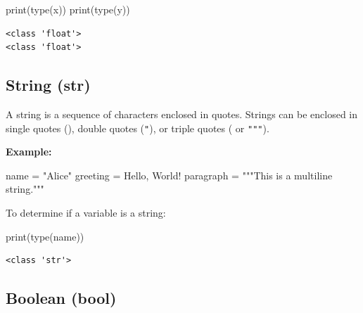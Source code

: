 \documentclass[
  letterpaper,
  DIV=11,
  numbers=noendperiod]{scrreprt}
\newenvironment{Shaded}{\begin{snugshade}}{\end{snugshade}}
\newcommand{\BuiltInTok}[1]{\textcolor[rgb]{0.00,0.23,0.31}{#1}}
\newcommand{\NormalTok}[1]{\textcolor[rgb]{0.00,0.23,0.31}{#1}}
\newcommand{\OperatorTok}[1]{\textcolor[rgb]{0.37,0.37,0.37}{#1}}
\newcommand{\StringTok}[1]{\textcolor[rgb]{0.13,0.47,0.30}{#1}}
\begin{document}
\begin{Shaded}
\begin{Highlighting}[]
\BuiltInTok{print}\NormalTok{(}\BuiltInTok{type}\NormalTok{(x))}
\BuiltInTok{print}\NormalTok{(}\BuiltInTok{type}\NormalTok{(y))}
\end{Highlighting}
\end{Shaded}

\begin{verbatim}
<class 'float'>
<class 'float'>
\end{verbatim}

\hypertarget{string-str}{%
\subsection{String (str)}\label{string-str}}

A string is a sequence of characters enclosed in quotes. Strings can be
enclosed in single quotes (\texttt{\textquotesingle{}}), double quotes
(\texttt{"}), or triple quotes
(\texttt{\textquotesingle{}\textquotesingle{}\textquotesingle{}} or
\texttt{"""}).

\textbf{Example:}

\begin{Shaded}
\begin{Highlighting}[]
\NormalTok{name }\OperatorTok{=} \StringTok{"Alice"}
\NormalTok{greeting }\OperatorTok{=} \StringTok{\textquotesingle{}Hello, World!\textquotesingle{}}
\NormalTok{paragraph }\OperatorTok{=} \StringTok{"""This is a}
\StringTok{multiline string."""}
\end{Highlighting}
\end{Shaded}

To determine if a variable is a string:

\begin{Shaded}
\begin{Highlighting}[]
\BuiltInTok{print}\NormalTok{(}\BuiltInTok{type}\NormalTok{(name)) }
\end{Highlighting}
\end{Shaded}

\begin{verbatim}
<class 'str'>
\end{verbatim}

\hypertarget{boolean-bool}{%
\subsection{Boolean (bool)}\label{boolean-bool}}
\end{document}
